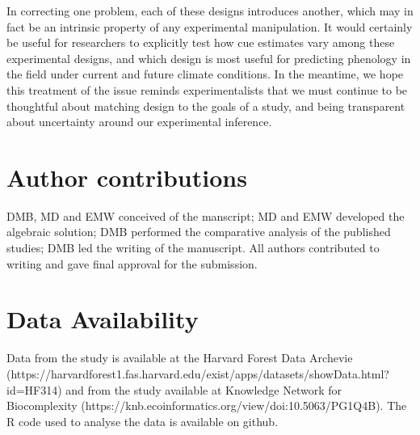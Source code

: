 \documentclass[11pt]{article}
\begin{document}
In correcting one problem, each of these designs introduces another, which may in fact be an intrinsic property of any experimental manipulation. It would certainly be useful for researchers to explicitly test how cue estimates vary among these experimental designs, and which design is most useful for predicting phenology in the field under current and future climate conditions. In the meantime, we hope this treatment of the issue reminds experimentalists that we must continue to be thoughtful about matching design to the goals of a study, and being transparent about uncertainty around our experimental inference.

\section*{Author contributions}
DMB, MD and EMW conceived of the manscript; MD and EMW developed the algebraic solution; DMB performed the comparative analysis of the published studies; DMB led the writing of the manuscript. All authors contributed to writing and gave final approval for the submission.

\section*{Data Availability}
Data from the \cite{Flynn2018} study is available at the Harvard Forest Data Archevie (https://harvardforest1.fas.harvard.edu/exist/apps/datasets/showData.html?id=HF314) and from the \citet{Buonaiuto:2021ug} study available at Knowledge Network for Biocomplexity (https://knb.ecoinformatics.org/view/doi:10.5063/PG1Q4B). The R code used to analyse the data is available on github.


\end{document}
